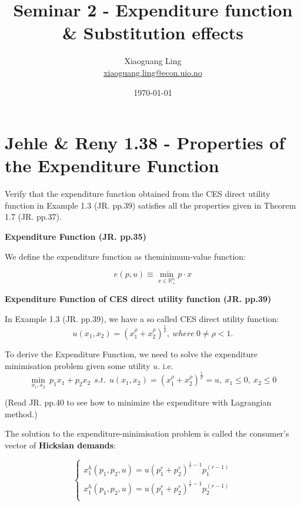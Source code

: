 \documentclass{article}
\title{Seminar 2 - Expenditure function \& Substitution effects}
\author{Xiaoguang Ling \\  \href{xiaoguang.ling@econ.uio.no}{xiaoguang.ling@econ.uio.no}}
\date{\today}
\newcommand{\R}{\mathbb{R}}
\begin{document}
\maketitle

\section{Jehle \& Reny 1.38 - Properties of the Expenditure Function}
Verify that the expenditure function obtained from the CES direct utility function in Example 1.3 
(JR. pp.39) satisfies all the properties given in Theorem 1.7 (JR. pp.37).

\begin{mdframed}[backgroundcolor=blue!20,linecolor=white]

\textbf{Expenditure Function (JR. pp.35)}

\medskip

We define the expenditure function as theminimum-value function:

$$e(p, u) \equiv \min_{x \in \R^n_+} p \cdot x$$

\textbf{Expenditure Function of CES direct utility function (JR. pp.39)}

\medskip

In Example 1.3 (JR. pp.39), we have a so called CES  direct utility function:
$$u(x_1, x_2) = (x_1^{\rho} + x_2^{\rho})^{\frac{1}{\rho}},\ where \ 0 \ne \rho<1.$$

To derive the Expenditure Function, we need to solve the expenditure minimisation problem
given some utility $u$. i.e.
$$\min_{x_1,x_2} \ p_1x_1 + p_2x_2 \ \ s.t.  \ \ u(x_1, x_2) = (x_1^{\rho} + x_2^{\rho})^{\frac{1}{\rho}} = u, \ x_1 \le 0, \ x_2 \le 0$$

(Read JR. pp.40 to see how to minimize the expenditure with Lagrangian method.)

\medskip

The solution to the expenditure-minimisation problem is called the consumer’s
vector of \textbf{Hicksian demands}:

\begin{equation}
    \begin{cases}
    x_1^h(p_1,p_2,u) = u(p_1^{r} + p_2^{r})^{\frac{1}{r}-1} p_1^{(r-1)} \\	
    x_1^h(p_1,p_2,u) = u(p_1^{r} + p_2^{r})^{\frac{1}{r}-1} p_2^{(r-1)} \\	
    \end{cases}
    \label{eq:1_38_hicks}   
\end{equation}


\end{mdframed}
\end{document}
